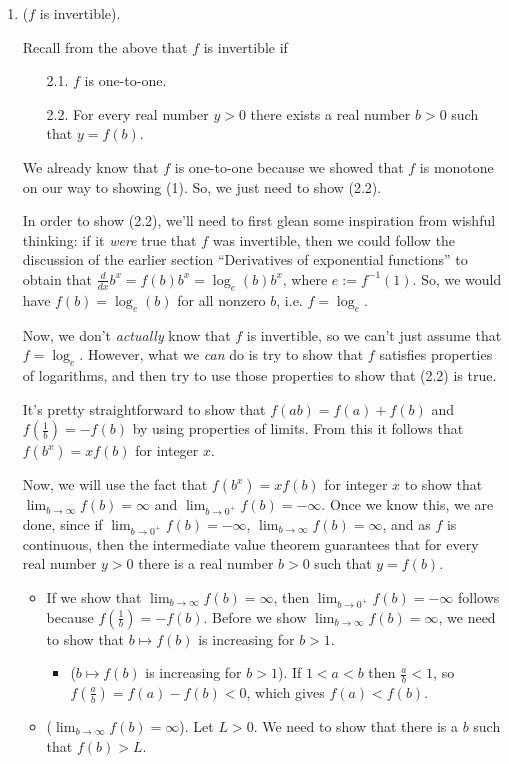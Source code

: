\documentclass{article}
\begin{document}
\begin{enumerate}
    \item ($f$ is invertible).
    
    Recall from the above that $f$ is invertible if
    
    \begin{enumerate}
        \item[2.1.] $f$ is one-to-one.
        \item[2.2.] For every real number $y > 0$ there exists a real number $b > 0$ such that $y = f(b)$.
    \end{enumerate}
    
    We already know that $f$ is one-to-one because we showed that $f$ is monotone on our way to showing (1). So, we just need to show (2.2).
    
    In order to show (2.2), we'll need to first glean some inspiration from wishful thinking: if it \textit{were} true that $f$ was invertible, then we could follow the discussion of the earlier section ``Derivatives of exponential functions'' to obtain that $\frac{d}{dx} b^x = f(b) b^x = \log_e(b) b^x$, where $e := f^{-1}(1)$. So, we would have $f(b) = \log_e(b)$ for all nonzero $b$, i.e. $f = \log_e$.
    
    Now, we don't \textit{actually} know that $f$ is invertible, so we can't just assume that $f = \log_e$. However, what we \textit{can} do is try to show that $f$ satisfies properties of logarithms, and then try to use those properties to show that (2.2) is true.
    
    It's pretty straightforward to show that $f(ab) = f(a) + f(b)$ and $f(\frac{1}{b}) = -f(b)$ by using properties of limits. From this it follows that $f(b^x) = xf(b)$ for integer $x$.
        
    Now, we will use the fact that $f(b^x) = xf(b)$ for integer $x$ to show that $\lim_{b \rightarrow \infty} f(b) = \infty$ and $\lim_{b \rightarrow 0^+} f(b) = -\infty$. Once we know this, we are done, since if $\lim_{b \rightarrow 0^+} f(b) = -\infty$, $\lim_{b \rightarrow \infty} f(b) = \infty$, and as $f$ is continuous, then the intermediate value theorem guarantees that for every real number $y > 0$ there is a real number $b > 0$ such that $y = f(b)$.
    
    \begin{itemize}
        \item If we show that $\lim_{b \rightarrow \infty} f(b) = \infty$, then $\lim_{b \rightarrow 0^+} f(b) = -\infty$ follows because $f(\frac{1}{b}) = -f(b)$. Before we show $\lim_{b \rightarrow \infty} f(b) = \infty$, we need to show that $b \mapsto f(b)$ is increasing for $b > 1$.
        \begin{itemize}
            \item ($b \mapsto f(b)$ is increasing for $b > 1$). If $1 < a < b$ then $\frac{a}{b} < 1$, so $f(\frac{a}{b}) = f(a) - f(b) < 0$, which gives $f(a) < f(b)$.
        \end{itemize}
        \item ($\lim_{b \rightarrow \infty} f(b) = \infty$). Let $L > 0$. We need to show that there is a $b$ such that $f(b) > L$. 
            

\end{itemize}
\end{enumerate}
\end{document}
